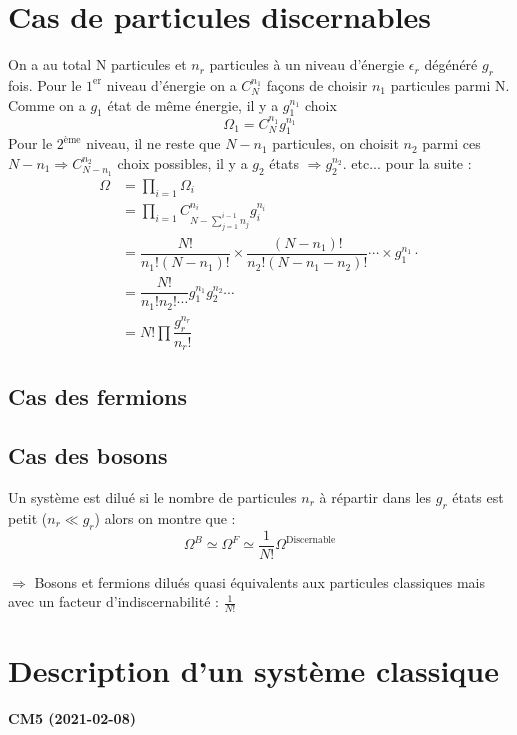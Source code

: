 \documentclass[12pt,a4paper]{report}
\begin{document}
\section{Cas de particules discernables}

On a au total N particules et $n_r$ particules à un niveau d'énergie $\epsilon_r$ dégénéré $g_r$ fois.
Pour le $1^{\text{er}}$ niveau d'énergie on a $C_N^{n_1}$ façons de choisir $n_1$ particules parmi N.
Comme on a $g_1$ état de même énergie, il y a $g_1^{n_1}$ choix
\[
	\Omega_1 = C_N^{n_1} g_1^{n_1}
\]
Pour le $2^{\text{ème}}$ niveau, il ne reste que $N - n_1$ particules, on choisit $n_2$ parmi ces $N - n_1 \Rightarrow C_{N-n_1}^{n_2}$ choix possibles, il y a $g_2$ états $\Rightarrow g_2^{n_2}$.
etc... pour la suite :
\begin{align*}
	\Omega &= \prod_{i=1} \Omega_i\\
	&= \prod_{i=1} C_{N-\sum_{j=1}^{i-1} n_j}^{n_i} g_i^{n_i}\\
	&= \dfrac{N!}{n_1!(N-n_1)!} \times \dfrac{(N-n_1)!}{n_2!(N-n_1-n_2)!}\cdots \times g_1^{n_1} \cdot\\
	&= \dfrac{N!}{n_1!n_2! \cdots} g_1^{n_1}g_2^{n_2} \cdots\\
	&= N! \prod \dfrac{g_r^{n_r}}{n_r!}
\end{align*}


\subsection{Cas des fermions}

\subsection{Cas des bosons}

Un système est dilué si le nombre de particules $n_r$ à répartir dans les $g_r$ états est petit ($n_r \ll g_r$) alors on montre que :
\[
	\Omega^B \simeq \Omega^F \simeq \dfrac{1}{N!}\Omega^{\text{Discernable}}
\]

$\Rightarrow$ Bosons et fermions dilués quasi équivalents aux particules classiques mais avec un facteur d'indiscernabilité : $\frac{1}{N!}$

\section{Description d'un système classique}

\begin{center}
\textbf{CM5 (2021-02-08)}
\end{center}
\end{document}
